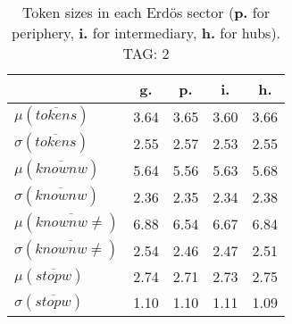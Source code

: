 \begin{table}[h!]
\begin{center}
\begin{tabular}{| l || c | c | c | c |}\hline
 & {\bf g.} & {\bf p.} & {\bf i.} & {\bf h.} \\\hline\hline
$\mu(\overline{tokens})$ & 3.64  & 3.65  & 3.60  & 3.66 \\
$\sigma(\overline{tokens})$ & 2.55  & 2.57  & 2.53  & 2.55 \\\hline
$\mu(\overline{knownw})$ & 5.64  & 5.56  & 5.63  & 5.68 \\
$\sigma(\overline{knownw})$ & 2.36  & 2.35  & 2.34  & 2.38 \\\hline
$\mu(\overline{knownw \neq})$ & 6.88  & 6.54  & 6.67  & 6.84 \\
$\sigma(\overline{knownw \neq})$ & 2.54  & 2.46  & 2.47  & 2.51 \\\hline
$\mu(\overline{stopw})$ & 2.74  & 2.71  & 2.73  & 2.75 \\
$\sigma(\overline{stopw})$ & 1.10  & 1.10  & 1.11  & 1.09 \\\hline
\end{tabular}
\caption{Token sizes in each Erd\"os sector ({{\bf p.}} for periphery, {{\bf i.}} for intermediary, {{\bf h.}} for hubs). TAG: 2}
\end{center}
\end{table}